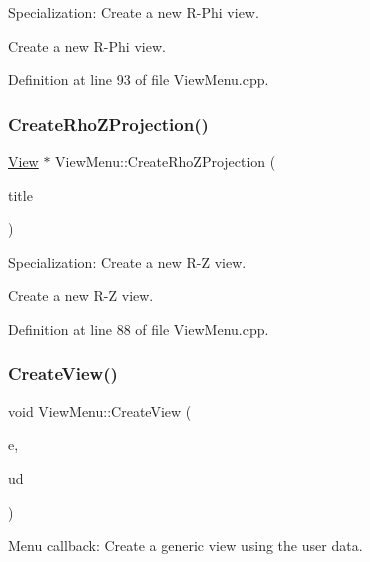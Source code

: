 Specialization\+: Create a new R-\/\+Phi view. 

Create a new R-\/\+Phi view. 

Definition at line 93 of file View\+Menu.\+cpp.

\hypertarget{class_d_d4hep_1_1_view_menu_a1ef807a24d6a871036cd738e45a8cedf}{}\label{class_d_d4hep_1_1_view_menu_a1ef807a24d6a871036cd738e45a8cedf} 
\subsubsection{\texorpdfstring{Create\+Rho\+Z\+Projection()}{CreateRhoZProjection()}}
{\footnotesize\ttfamily \hyperlink{class_d_d4hep_1_1_view}{View} $\ast$ View\+Menu\+::\+Create\+Rho\+Z\+Projection (\begin{DoxyParamCaption}\item[{const std\+::string \&}]{title }\end{DoxyParamCaption})}



Specialization\+: Create a new R-\/Z view. 

Create a new R-\/Z view. 

Definition at line 88 of file View\+Menu.\+cpp.

\hypertarget{class_d_d4hep_1_1_view_menu_ad72d3a90a912cf08292c278a45701b93}{}\label{class_d_d4hep_1_1_view_menu_ad72d3a90a912cf08292c278a45701b93} 
\subsubsection{\texorpdfstring{Create\+View()}{CreateView()}\hspace{0.1cm}{\footnotesize\ttfamily [1/2]}}
{\footnotesize\ttfamily void View\+Menu\+::\+Create\+View (\begin{DoxyParamCaption}\item[{T\+G\+Menu\+Entry $\ast$}]{e,  }\item[{void $\ast$}]{ud }\end{DoxyParamCaption})}



Menu callback\+: Create a generic view using the user data. 

